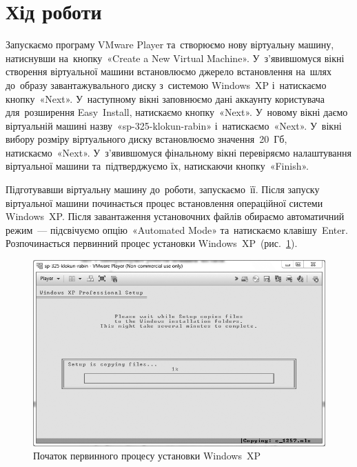 \documentclass[
	a4paper,
	oneside,
	DIV = 12,
	fontsize = 13pt,
	headings = normal,
]{scrartcl}
\begin{document}
	\section{Хід роботи}
		Запускаємо програму VMware Player та~створюємо нову віртуальну машину, натиснувши на~кнопку~«Create a New Virtual Machine». У~з'я\-вив\-шо\-муся вікні створення віртуальної машини встановлюємо джерело встановлення на~шлях до~образу завантажувального диску з~системою Windows~XP і~натискаємо кнопку~«Next». У~наступному вікні заповнюємо дані аккаунту користувача для~розширення Easy~Install, натискаємо кнопку~«Next». У~новому вікні даємо віртуальній машині назву~«sp-325-klokun-rabin» і~натискаємо~«Next». У~вікні вибору розміру віртуального диску встановлюємо значення~20~Гб, натискаємо~«Next». У~з'явившомуся фінальному вікні перевіряємо налаштування віртуальної машини та~підтверджуємо їх, натискаючи кнопку~«Finish». 
		
		Підготувавши віртуальну машину до~роботи, запускаємо~її. Після запуску віртуальної машини починається процес встановлення операційної системи Windows~XP. Після завантаження установочних файлів обираємо автоматичний режим~— підсвічуємо опцію~«Automated Mode» та~натискаємо клавішу~Enter. Розпочинається первинний процес установки Windows~XP~(рис.~\ref{fig:01-winxp-install-primary}).
		\begin{figure}[!htbp]
			\centering
			\includegraphics[height = 7\baselineskip]{./assets/y03s01-pcdiag-lab-01-01-bw.png}
			\caption{Початок первинного процесу установки Windows~XP}
			\label{fig:01-winxp-install-primary}
		\end{figure}
\end{document}
